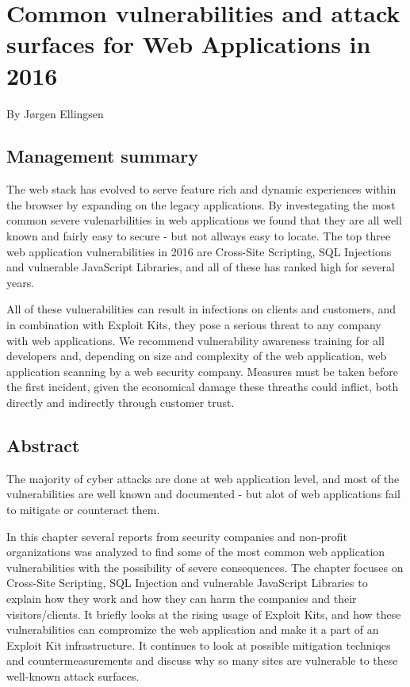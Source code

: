 \chapter[Web Application vulnerabilities in 2016]{Common vulnerabilities and attack surfaces for Web Applications in 2016}
\small{By J{\o}rgen Ellingsen}
\section*{Management summary}
The web stack has evolved to serve feature rich and dynamic experiences within the browser by expanding on the legacy applications. By investegating the most common severe vulenarbilities in web applications we found that they are all well known and fairly easy to secure - but not allways easy to locate. The top three web application vulnerabilities in 2016 are Cross-Site Scripting, SQL Injections and vulnerable JavaScript Libraries, and all of these has ranked high for several years.

All of these vulnerabilities can result in infections on clients and customers, and in combination with Exploit Kits, they pose a serious threat to any company with web applications. We recommend vulnerability awareness training for all developers and, depending on size and complexity of the web application, web application scanning by a web security company. Measures must be taken before the first incident, given the economical damage these threaths could inflict, both directly and indirectly through customer trust.
\section*{Abstract}
The majority of cyber attacks are done at web application level, and most of the vulnerabilities are well known and documented - but alot of web applications fail to mitigate or counteract them.

In this chapter several reports from security companies and non-profit organizations was analyzed to find some of the most common web application vulnerabilities with the possibility of severe consequences. The chapter focuses on Cross-Site Scripting, SQL Injection and vulnerable JavaScript Libraries to explain how they work and how they can harm the companies and their visitors/clients. It briefly looks at the rising usage of Exploit Kits, and how these vulnerabilities can compromize the web application and make it a part of an Exploit Kit infrastructure. It continues to look at possible mitigation techniqes and countermeasurements and discuss why so many sites are vulnerable to these well-known attack surfaces.
